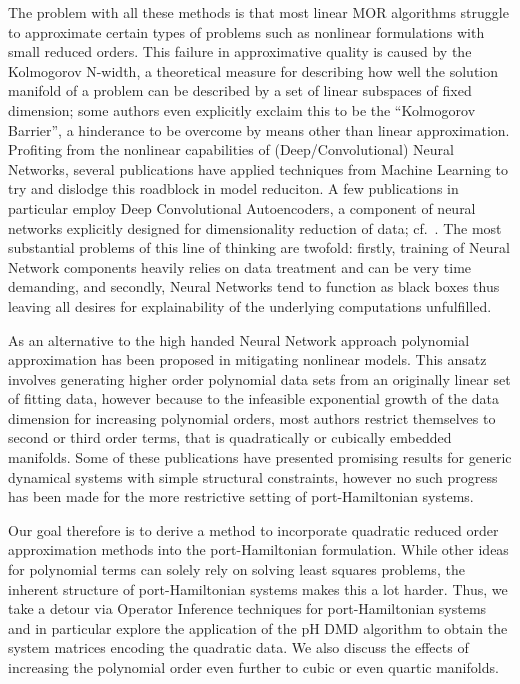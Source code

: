 The problem with all these methods is that most linear MOR algorithms struggle to approximate certain types of problems such as nonlinear formulations with small reduced orders.
This failure in approximative quality is caused by the Kolmogorov N-width, a theoretical measure for describing how well the solution manifold of a problem can be described by a set of linear subspaces of fixed dimension; some authors even explicitly exclaim this to be the ``Kolmogorov Barrier'', a hinderance to be overcome by means other than linear approximation.
Profiting from the nonlinear capabilities of (Deep/Convolutional) Neural Networks, several publications have applied techniques from Machine Learning to try and dislodge this roadblock in model reduciton.
A few publications in particular employ Deep Convolutional Autoencoders, a component of neural networks explicitly designed for dimensionality reduction of data; cf.~\cite{Lee2020, Romor2023, Buchfink2023}.
The most substantial problems of this line of thinking are twofold: firstly, training of Neural Network components heavily relies on data treatment and can be very time demanding, and secondly, Neural Networks tend to function as black boxes thus leaving all desires for explainability of the underlying computations unfulfilled.

As an alternative to the high handed Neural Network approach polynomial approximation has been proposed in mitigating nonlinear models.
This ansatz involves generating higher order polynomial data sets from an originally linear set of fitting data, however because to the infeasible exponential growth of the data dimension for increasing polynomial orders, most authors restrict themselves to second or third order terms, that is quadratically or cubically embedded manifolds.
Some of these publications have presented promising results for generic dynamical systems with simple structural constraints, however no such progress has been made for the more restrictive setting of port-Hamiltonian systems.


Our goal therefore is to derive a method to incorporate quadratic reduced order approximation methods into the port-Hamiltonian formulation.
While other ideas for polynomial terms can solely rely on solving least squares problems, the inherent structure of port-Hamiltonian systems makes this a lot harder.
Thus, we take a detour via Operator Inference techniques for port-Hamiltonian systems and in particular explore the application of the pH DMD algorithm to obtain the system matrices encoding the quadratic data.
We also discuss the effects of increasing the polynomial order even further to cubic or even quartic manifolds.


